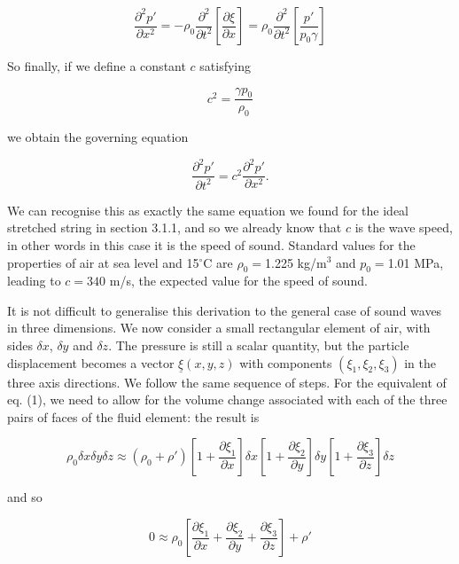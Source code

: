   \begin{equation*}\frac{\partial^2 p'}{\partial x^2} = -\rho_0 
  \frac{\partial^2}{\partial t^2} \left[ \frac{\partial \xi}{\partial x} 
  \right]= \rho_0 \frac{\partial^2}{\partial t^2} \left[ \frac{p'}{p_0 \gamma} 
  \right] \tag{10}\end{equation*} 

  So finally, if we define a constant $c$ satisfying 

  \begin{equation*}c^2 =\frac{\gamma p_0}{\rho_0} \tag{11}\end{equation*} 

  \noindent{}we obtain the governing equation 

  \begin{equation*}\frac{\partial^2 p'}{\partial t^2}= c^2 \frac{\partial^2 
  p'}{\partial x^2} .\tag{12}\end{equation*} 

  We can recognise this as exactly the same equation we found for the ideal 
  stretched string in section 3.1.1, and so we already know that $c$ is the 
  wave speed, in other words in this case it is the speed of sound. Standard 
  values for the properties of air at sea level and 15$^\circ$C are 
  $\rho_0=$1.225 kg/m$^3$ and $p_0=$1.01 MPa, leading to $c=340$ m/s, the 
  expected value for the speed of sound. 

  It is not difficult to generalise this derivation to the general case of 
  sound waves in three dimensions. We now consider a small rectangular element 
  of air, with sides $\delta x$, $\delta y$ and $\delta z$. The pressure is 
  still a scalar quantity, but the particle displacement becomes a vector 
  $\underline{\xi}(x,y,z)$ with components $(\xi_1,\xi_2,\xi_3) $ in the three 
  axis directions. We follow the same sequence of steps. For the equivalent of 
  eq. (1), we need to allow for the volume change associated with each of the 
  three pairs of faces of the fluid element: the result is 

  \begin{equation*}\rho_0 \delta x \delta y \delta z \approx (\rho_0 + \rho') 
  \left[1 + \frac{\partial \xi_1}{\partial x} \right] \delta x \left[1 + 
  \frac{\partial \xi_2}{\partial y} \right] \delta y \left[1 + \frac{\partial 
  \xi_3}{\partial z} \right] \delta z \tag{13}\end{equation*} 

  \noindent{}and so 

  \begin{equation*}0 \approx \rho_0 \left[\frac{\partial \xi_1}{\partial x} + 
  \frac{\partial \xi_2}{\partial y} + \frac{\partial \xi_3}{\partial z} \right] 
  + \rho' \tag{14}\end{equation*} 

